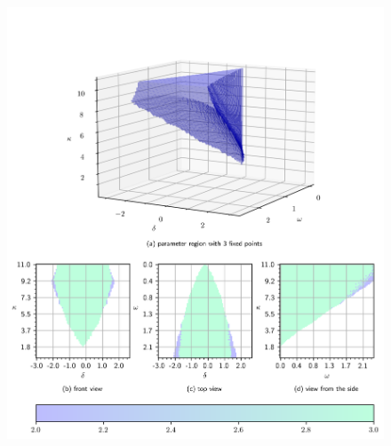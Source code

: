 \documentclass{article}
\begin{document}
\begin{figure}[H]
    \vspace{-0.35cm}
    \hspace*{-1.3cm}
    \includegraphics{pictures/numb_of_fixp_extended1.png}
\end{figure}
\end{document}
